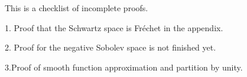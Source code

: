 
This is a checklist of incomplete proofs.

1. Proof that the Schwartz space is Fr\'echet in the appendix.

2. Proof for the negative Sobolev space is not finished yet.

3.Proof of smooth function approximation and partition by unity.
